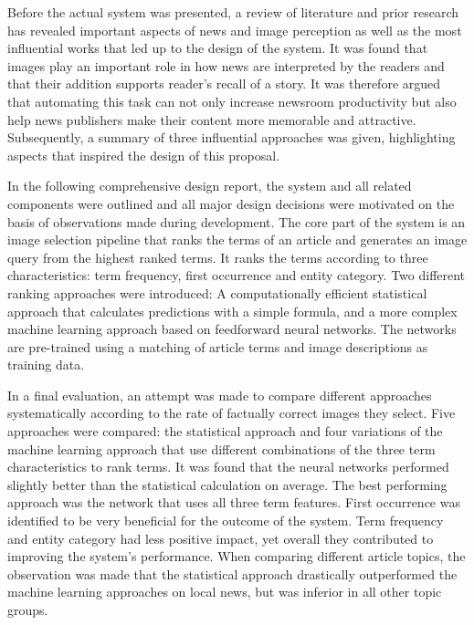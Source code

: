 \documentclass[11pt,a4paper,twoside]{article}
\begin{document}
Before the actual system was presented, a review of literature and prior research has revealed important aspects of news and image perception as well as the most influential works that led up to the design of the system. It was found that images play an important role in how news are interpreted by the readers and that their addition supports reader's recall of a story. It was therefore argued that automating this task can not only increase newsroom productivity but also help news publishers make their content more memorable and attractive. Subsequently, a summary of three influential approaches was given, highlighting aspects that inspired the design of this proposal.

In the following comprehensive design report, the system and all related components were outlined and all major design decisions were motivated on the basis of observations made during development. The core part of the system is an image selection pipeline that ranks the terms of an article and generates an image query from the highest ranked terms. It ranks the terms according to three characteristics: term frequency, first occurrence and entity category. Two different ranking approaches were introduced: A computationally efficient statistical approach that calculates predictions with a simple formula, and a more complex machine learning approach based on feedforward neural networks. The networks are pre-trained using a matching of article terms and image descriptions as training data.

In a final evaluation, an attempt was made to compare different approaches systematically according to the rate of factually correct images they select. Five approaches were compared: the statistical approach and four variations of the machine learning approach that use different combinations of the three term characteristics to rank terms. It was found that the neural networks performed slightly better than the statistical calculation on average. The best performing approach was the network that uses all three term features. First occurrence was identified to be very beneficial for the outcome of the system. Term frequency and entity category had less positive impact, yet overall they contributed to improving the system's performance. When comparing different article topics, the observation was made that the statistical approach drastically outperformed the machine learning approaches on local news, but was inferior in all other topic groups.

\bigskip
\end{document}

